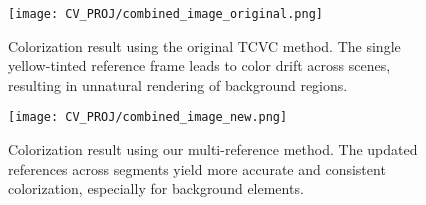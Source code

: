 \documentclass[10pt,twocolumn,letterpaper]{article}
\begin{document}
\begin{figure}[ht]
    \centering
    \texttt{[image: CV\_PROJ/combined\_image\_original.png]}
    \caption{Colorization result using the original TCVC method. The single yellow-tinted reference frame leads to color drift across scenes, resulting in unnatural rendering of background regions.}

    \label{fig:combined_image_original}
\end{figure}

\begin{figure}[ht]
    \centering
    \texttt{[image: CV\_PROJ/combined\_image\_new.png]}
    \caption{Colorization result using our multi-reference method. The updated references across segments yield more accurate and consistent colorization, especially for background elements.}

    \label{fig:combined_image_new}
\end{figure}
\end{document}
